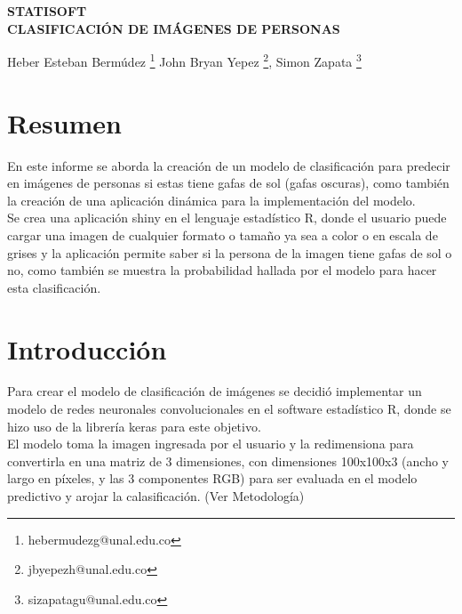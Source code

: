 \documentclass[11pt,twoside]{article}
\date{}
\begin{document}
	{
		\fancyhead[L]{}
		\fancyfoot[LO,RE]{}
		\fancyfoot[LE,RO]{ \vspace{10pt}\thepage}
		\renewcommand{\headrulewidth}{0pt}
		\renewcommand{\footrulewidth}{0pt}
	}
	
	\thispagestyle{firststyle}
	\begin{center}
		\Large{{\bf STATISOFT\\
				\vspace{20pt}   CLASIFICACIÓN DE IMÁGENES DE PERSONAS\\ 
				\vspace{10pt}}}
	\end{center}
	
	{\normalsize{
			Heber Esteban Bermúdez			\footnote{\footnotesize{ hebermudezg@unal.edu.co}}
			John Bryan Yepez				\footnote{\footnotesize{ jbyepezh@unal.edu.co}},
			Simon Zapata 					\footnote{\footnotesize{sizapatagu@unal.edu.co}}
	}}
	
	
	



\section*{Resumen}
\noindent
En este informe se aborda la creación de un modelo de clasificación para predecir en imágenes de personas si estas tiene gafas de sol (gafas oscuras), como también la creación de una aplicación dinámica para la implementación del modelo.\\
Se crea una aplicación shiny en el lenguaje estadístico R,  donde el usuario puede cargar una imagen de cualquier formato o tamaño ya sea a color o en escala de grises y la aplicación permite  saber si la persona de la imagen tiene gafas de sol o no, como también se muestra la probabilidad hallada por el modelo para hacer esta clasificación.

\section*{Introducción}
\noindent
Para crear el modelo de clasificación de imágenes se decidió implementar un modelo de redes neuronales convolucionales en el software estadístico R, donde se hizo uso de la librería keras para este objetivo. \\
\noindent
El modelo toma la imagen ingresada por el usuario y  la redimensiona para convertirla en una  matriz de 3 dimensiones, con dimensiones  100x100x3 (ancho y largo en píxeles, y las 3 componentes RGB) para ser evaluada en el modelo predictivo y arojar la calasificación. (Ver Metodología)
\end{document}
